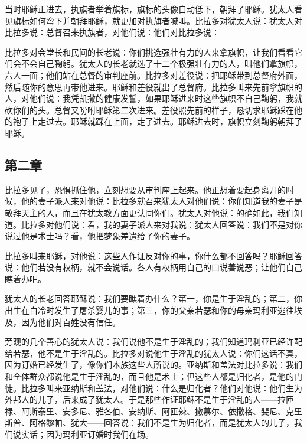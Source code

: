 当时耶稣正进去，执旗者举着旗标，旗标的头像自动低下，朝拜了耶稣。犹太人看见旗标如何弯下并朝拜耶稣，就更加对执旗者喊叫。比拉多对犹太人说：犹太人对比拉多说：总督召来执旗者，对他们说：他们对比拉多说：\par

比拉多对会堂长和民间的长老说：你们挑选强壮有力的人来拿旗帜，让我们看看它们会不会自己鞠躬。犹太人的长老就选了十二个极强壮有力的人，叫他们拿旗帜，六人一面；他们站在总督的审判座前。比拉多对差役说：把耶稣带到总督府外面，然后随你的意思再带他进来。耶稣和差役就出了总督府。比拉多叫来先前拿旗帜的人，对他们说：我凭凯撒的健康发誓，如果耶稣进来时这些旗帜不自己鞠躬，我就砍你们的头。总督又吩咐耶稣第二次进来。差役照先前的样子，恳切求耶稣踩在他的袍子上走过去。耶稣就踩在上面，走了进去。耶稣进去时，旗帜立刻鞠躬朝拜了耶稣。\par


\subsection{第二章}

比拉多见了，恐惧抓住他，立刻想要从审判座上起来。他正想着要起身离开的时候，他的妻子派人来对他说：比拉多就召来犹太人对他们说：你们知道我的妻子是敬拜天主的人，而且在犹太教方面更认同你们。犹太人对他说：的确如此，我们知道。比拉多对他们说：看，我的妻子派人来对我说：犹太人回答说：我们不是对你说过他是术士吗？看，他把梦象差遣给了你的妻子。\par

比拉多叫来耶稣，对他说：这些人作证反对你的事，你什么都不回答吗？耶稣回答说：他们若没有权柄，就不会说话。各人有权柄用自己的口说善说恶；让他们自己瞧着办吧。\par

犹太人的长老回答耶稣说：我们要瞧着办什么？第一，你是生于淫乱的；第二，你出生在白冷时发生了屠杀婴儿的事；第三，你的父亲若瑟和你的母亲玛利亚逃往埃及，因为他们对百姓没有信任。\par

旁观的几个善心的犹太人说：我们说他不是生于淫乱的；我们知道玛利亚已经许配给若瑟，他不是生于淫乱的。比拉多对说他生于淫乱的犹太人说：你们这话不真，因为订婚已经发生了，像你们本族这些人所说的。亚纳斯和盖法对比拉多说：我们和全体群众都说他是生于淫乱的，而且他是术士；但这些人都是归化者，是他的门徒。比拉多叫来亚纳斯和盖法，对他们说：什么是归化者？他们对他说：他们生为外邦人的儿子，后来成了犹太人。于是那些作证耶稣不是生于淫乱的人——拉匝禄、阿斯泰里、安多尼、雅各伯、安纳斯、阿匝辣、撒慕尔、依撒格、斐尼、克里斯普、阿格黎帕、犹大——回答说：我们不是生为归化者，而是犹太人的儿子，我们说实话；因为玛利亚订婚时我们在场。\par

